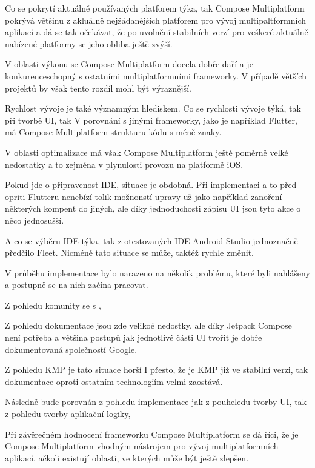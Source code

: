 Co se pokrytí aktuálně používaných platforem týka, tak Compose Multiplatform pokrývá většinu z akluálně nejžádanějších 
platforem pro vývoj multipaltformních aplikací a dá se tak očekávat, že po uvolnění stabilních verzí pro veškeré 
aktuálně nabízené platformy se jeho obliba ještě zvýší. 

V oblasti výkonu se Compose Multiplatform docela dobře daří a je konkurenceschopný s ostatními multiplatformními frameworky.
V případě větších projektů by však tento rozdíl mohl být výraznější.

Rychlost vývoje je také významným hlediskem. 
Co se rychlosti vývoje týká, tak při tvorbě UI, tak V porovnání s jinými frameworky, jako je například Flutter, má Compose Multiplatform strukturu kódu s méně znaky.


V oblasti optimalizace má však Compose Multiplatform ještě poměrně velké nedostatky a to zejména v plynulosti provozu na 
platformě iOS.


Pokud jde o připravenost IDE, situace je obdobná.  Při implementaci a to před
opriti Flutteru nenebízí tolik možnonstí upravy už jako  například zanoření některých kompent do jiných, ale díky jednoduchosti
zápisu UI jsou tyto akce o něco jednosušší.

A co se výběru IDE týka, tak z otestovaných IDE Android Studio jednoznačně předčilo Fleet. Nicméně tato situace se může, 
taktéž rychle změnit.

V průběhu implementace bylo narazeno na několik problému, které byli nahlášeny a postupně se na nich začína pracovat.

Z pohledu komunity se s ,


Z pohledu dokumentace jsou zde velikoé nedostky, ale díky Jetpack Compose není potřeba a většina postupů jak jednotlivé části 
UI tvořit je dobře dokumentovaná společností Google. 

Z pohledu KMP je tato situace horší
I přesto, že je KMP již ve stabilní verzi, tak dokumentace oproti ostatním technologiím velmi zaostává.



Následně bude porovnán z pohledu implementace  jak z pouheledu tvorby UI, tak z pohledu tvorby aplikační logiky,



Při závěrečném hodnocení frameworku Compose Multiplatform se dá říci, že 
je Compose Multiplatform vhodným nástrojem pro vývoj multiplatformních aplikací, ačkoli existují oblasti, 
ve kterých může být ještě zlepšen.


